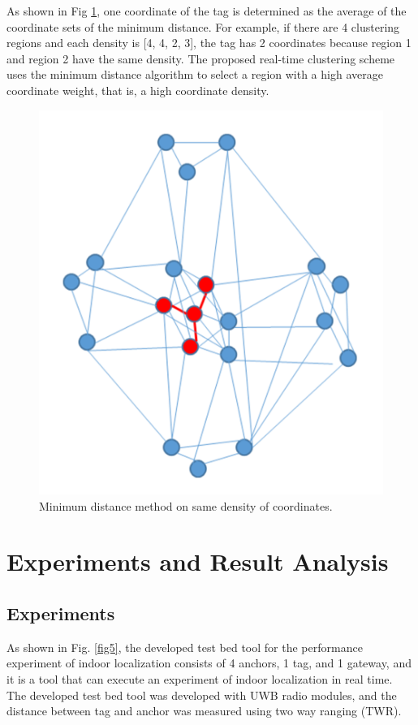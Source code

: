 \documentclass[conference]{IEEEtran}
\begin{document}
As shown in Fig \ref{fig4}, one coordinate of the tag is determined as the average of the coordinate sets of the minimum distance. For example, if there are 4 clustering regions and each density is [4, 4, 2, 3], the tag has 2 coordinates because region 1 and region 2 have the same density. The proposed real-time clustering scheme uses the minimum distance algorithm to select a region with a high average coordinate weight, that is, a high coordinate density.


\begin{figure}[htbp]
    \centerline{\includegraphics[width=0.5\columnwidth]{fig4.png}}
    \caption{Minimum distance method on same density of coordinates.}
    \label{fig4}
\end{figure}

\section{Experiments and Result Analysis}
\subsection{Experiments}

As shown in Fig. \ref{fig5}, the developed test bed tool for the performance experiment of indoor localization consists of 4 anchors, 1 tag, and 1 gateway, and it is a tool that can execute an experiment of indoor localization in real time. The developed test bed tool was developed with UWB radio modules, and the distance between tag and anchor was measured using two way ranging (TWR).
\end{document}
